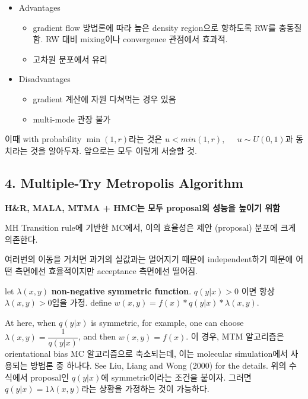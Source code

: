 \documentclass[
]{book}
\providecommand{\tightlist}{%
  \setlength{\itemsep}{0pt}\setlength{\parskip}{0pt}}
\begin{document}
\begin{itemize}
\tightlist
\item
  Advantages

  \begin{itemize}
  \tightlist
  \item
    gradient flow 방법론에 따라 높은 density region으로 향하도록 RW를 충동질함. RW 대비 mixing이나 convergence 관점에서 효과적.
  \item
    고차원 분포에서 유리
  \end{itemize}
\item
  Disadvantages

  \begin{itemize}
  \tightlist
  \item
    gradient 계산에 자원 다쳐먹는 경우 있음
  \item
    multi-mode 관장 불가
  \end{itemize}
\end{itemize}

이때 with probability \(\min (1, r)\)라는 것은 \(u < min(1,r), \; \; \; \; \; u \sim U(0,1)\)과 동치라는 것을 알아두자. 앞으로는 모두 이렇게 서술할 것.

\hypertarget{multiple-try-metropolis-algorithm}{%
\subsection{4. Multiple-Try Metropolis Algorithm}\label{multiple-try-metropolis-algorithm}}

\textbf{H\&R, MALA, MTMA + HMC는 모두 proposal의 성능을 높이기 위함}

MH Transition rule에 기반한 MC에서, 이의 효율성은 제안 (proposal) 분포에 크게 의존한다.

여러번의 이동을 거치면 과거의 실값과는 멀어지기 때문에 independent하기 때문에 어떤 측면에선 효율적이지만 acceptance 측면에선 떨어짐.

let \(\lambda(x,y)\) \textbf{non-negative symmetric function}. \(q(y \rvert x) >0\) 이면 항상 \(\lambda(x,y)>0\)임을 가정. define \(w(x,y)=f(x) \ast q(y \rvert x) \ast \lambda(x,y)\).

At here, when \(q(y \rvert x)\) is symmetric, for example, one can choose \(\lambda(x,y) = \dfrac {1} {q(y \rvert x)}\), and then \(w(x, y) = f(x)\). 이 경우, MTM 알고리즘은 orientational bias MC 알고리즘으로 축소되는데, 이는 molecular simulation에서 사용되는 방법론 중 하나다. See Liu, Liang and Wong (2000) for the details.
위의 수식에서 proposal인 \(q(y \vert x)\)에 symmetric이라는 조건을 붙이자. 그러면 \(q(y \vert x) = {1}{\lambda(x,y)}\)라는 상황을 가정하는 것이 가능하다.
\end{document}
